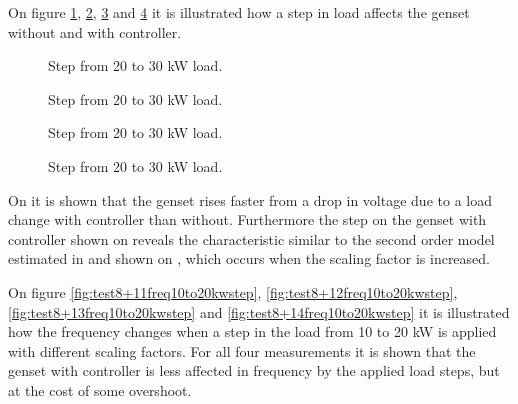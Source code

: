 On figure \ref{fig:test8+11volt20-30kwstep}, \ref{fig:test8+12volt20-30kwstep}, \ref{fig:test8+13volt20-30kwstep} and \ref{fig:test8+14volt20-30kwstep} it is illustrated how a step in load affects the genset without and with controller. 

\begin{figure}[H]
\centering

\caption{Step from 20 to 30 kW load. }
\label{fig:test8+11volt20-30kwstep}
\end{figure}


\begin{figure}[H]
\centering

\caption{Step from 20 to 30 kW load. }
\label{fig:test8+12volt20-30kwstep}
\end{figure}

\begin{figure}[H]
\centering

\caption{Step from 20 to 30 kW load. }
\label{fig:test8+13volt20-30kwstep}
\end{figure}

\begin{figure}[H]
\centering

\caption{Step from 20 to 30 kW load. }
\label{fig:test8+14volt20-30kwstep}
\end{figure}


On  it is shown that the genset rises faster from a drop in voltage due to a load change with controller than without. %
Furthermore the step on the genset with controller shown on  reveals the characteristic similar to the second order model estimated in  and shown on , which occurs when the scaling factor is increased.


On figure \ref{fig:test8+11freq10to20kwstep}, \ref{fig:test8+12freq10to20kwstep}, \ref{fig:test8+13freq10to20kwstep} and \ref{fig:test8+14freq10to20kwstep} it is illustrated how the frequency changes when a step in the load from 10 to 20 kW is applied with different scaling factors. %
For all four measurements it is shown that the genset with controller is less affected in frequency by the applied load steps, but at the cost of some overshoot. 

